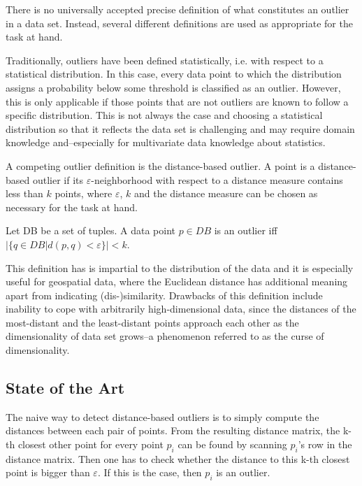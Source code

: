 \documentclass[runningheads]{llncs}
\begin{document}
There is no universally accepted precise definition of what constitutes an outlier in a data set. Instead, several different definitions are used as appropriate for the task at hand.

Traditionally, outliers have been defined statistically, i.e. with respect to a statistical distribution. In this case, every data point to which the distribution assigns a probability below some threshold is classified as an outlier. However, this is only applicable if those points that are not outliers are known to follow a specific distribution. This is not always the case and choosing a statistical distribution so that it reflects the data set is challenging and may require domain knowledge and--especially for multivariate data knowledge about statistics.

A competing outlier definition is the distance-based outlier. A point is a distance-based outlier if its $\varepsilon$-neighborhood with respect to a distance measure contains less than $k$ points, where $\varepsilon$, $k$ and the distance measure can be chosen as necessary for the task at hand.

\begin{definition}
    Let DB be a set of tuples. A data point $p\in DB$ is an outlier iff 
    $|\{q \in DB | d(p,q) < \varepsilon\}| < k$.
\end{definition}

This definition has is impartial to the distribution of the data and it is especially useful for geospatial data, where the Euclidean distance has additional meaning apart from indicating (dis-)similarity. Drawbacks of this definition include inability to cope with arbitrarily high-dimensional data, since the distances of the most-distant and the least-distant points approach each other as the dimensionality of data set grows--a phenomenon referred to as the curse of dimensionality. %

\subsection{State of the Art}

The naive way to detect distance-based outliers is to simply compute the distances between each pair of points. From the resulting distance matrix, the k-th closest other point for every point $p_i$ can be found by scanning $p_i$'s row in the distance matrix. Then one has to check whether the distance to this k-th closest point is bigger than $\varepsilon$. If this is the case, then $p_i$ is an outlier.
\end{document}
